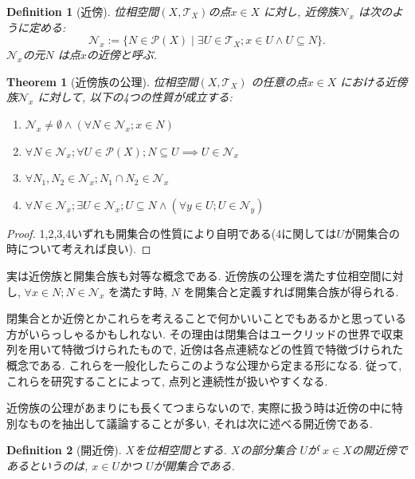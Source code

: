 \documentclass[dvipdfmx]{jbook}
\newtheorem{theorem}{Theorem}[section]
\newtheorem{definition}{Definition}[section]
\theoremstyle{remark}
\theoremstyle{plain}
\begin{document}
\begin{definition}[近傍]
	位相空間$\left( X, \mathcal{T}_X \right)$の点$x \in X$ に対し, 近傍族$\mathcal{N}_x$ は次のように定める:
	\[
	\mathcal{N}_x := \{N \in \mathcal{P}\left( X \right)  \mid \exists U \in \mathcal{T}_X ; x \in U \land U \subseteq N \} 
	.\] 
	$\mathcal{N}_x $の元$N$ は点$x$の近傍と呼ぶ.
\end{definition}

\begin{theorem}[近傍族の公理]
	位相空間$\left( X ,\mathcal{T}_X \right) $ の任意の点$x\in X$ における近傍族$\mathcal{N}_x$ に対して, 以下の4つの性質が成立する:
	\begin{enumerate}
		\item $\mathcal{N}_x \neq \emptyset \land \left( \forall N \in \mathcal{N}_x ; x \in N \right)$
		\item $\forall N \in \mathcal{N}_x; \forall U \in \mathcal{P}\left( X \right) ; N\subseteq U \implies U \in \mathcal{N}_x$
		\item $\forall N_1, N_2 \in \mathcal{N}_x ; N_1 \cap N_2 \in \mathcal{N}_x$
		\item $\forall N \in \mathcal{N}_x; \exists U \in \mathcal{N}_x ;U\subseteq N\land \left( \forall y \in U; U \in \mathcal{N}_y  \right)  $
	\end{enumerate}
\end{theorem}

\begin{proof}
	1,2,3,4いずれも開集合の性質により自明である(4に関しては$U$が開集合の時について考えれば良い).
\end{proof}

実は近傍族と開集合族も対等な概念である. 近傍族の公理を満たす位相空間に対し, $\forall x \in N; N \in \mathcal{N}_x$ を満たす時, $N$ を開集合と定義すれば開集合族が得られる. 

閉集合とか近傍とかこれらを考えることで何かいいことでもあるかと思っている方がいらっしゃるかもしれない.
その理由は閉集合はユークリッドの世界で収束列を用いて特徴づけられたもので, 近傍は各点連続などの性質で特徴づけられた概念である.
これらを一般化したらこのような公理から定まる形になる. 従って, これらを研究することによって, 点列と連続性が扱いやすくなる.

近傍族の公理があまりにも長くてつまらないので, 実際に扱う時は近傍の中に特別なものを抽出して議論することが多い, それは次に述べる開近傍である.





\begin{definition}[開近傍]
	$X$を位相空間とする. $X$の部分集合 $U$が $x \in X$の開近傍であるというのは,  $ x \in U$かつ $U$が開集合である.
\end{definition}
\end{document}

